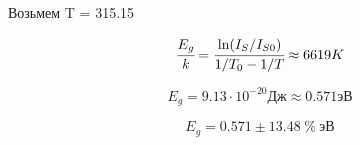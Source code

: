 \documentclass[a4paper, 14pt]{extarticle}
\begin{document}
\begin{center}
  Возьмем T = 315.15
\end{center}

\begin{equation*}
  \cfrac{E_g}{k} = \cfrac{\text{ln}(I_S/I_{S0})}{1/T_0 - 1/T} \approx 6619 K
\end{equation*}

\begin{equation*}
  E_g = 9.13 \cdot 10^{-20} \text{Дж} \approx 0.571 \text{эВ}
\end{equation*}

\begin{equation*}
  E_g = 0.571 \pm 13.48 \hspace{3pt} \% \hspace{3pt} \text{эВ}
\end{equation*}
\end{document}
